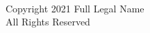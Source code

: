 

\chapter*{}
\hspace{1em}\vspace{18em} \\ %
\begin{center}
    Copyright {\textcopyright} 2021 Full Legal Name \\
    All Rights Reserved     
\end{center}


